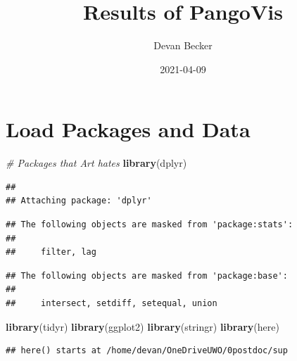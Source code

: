 \documentclass[
]{article}
\title{Results of PangoVis}
\author{Devan Becker}
\date{2021-04-09}
\newenvironment{Shaded}{\begin{snugshade}}{\end{snugshade}}
\newcommand{\CommentTok}[1]{\textcolor[rgb]{0.56,0.35,0.01}{\textit{#1}}}
\newcommand{\KeywordTok}[1]{\textcolor[rgb]{0.13,0.29,0.53}{\textbf{#1}}}
\newcommand{\NormalTok}[1]{#1}
\begin{document}
\maketitle

\hypertarget{load-packages-and-data}{%
\section{Load Packages and Data}\label{load-packages-and-data}}

\begin{Shaded}
\begin{Highlighting}[]
\CommentTok{\# Packages that Art hates}
\KeywordTok{library}\NormalTok{(dplyr)}
\end{Highlighting}
\end{Shaded}

\begin{verbatim}
## 
## Attaching package: 'dplyr'
\end{verbatim}

\begin{verbatim}
## The following objects are masked from 'package:stats':
## 
##     filter, lag
\end{verbatim}

\begin{verbatim}
## The following objects are masked from 'package:base':
## 
##     intersect, setdiff, setequal, union
\end{verbatim}

\begin{Shaded}
\begin{Highlighting}[]
\KeywordTok{library}\NormalTok{(tidyr)}
\KeywordTok{library}\NormalTok{(ggplot2)}
\KeywordTok{library}\NormalTok{(stringr)}
\KeywordTok{library}\NormalTok{(here)}
\end{Highlighting}
\end{Shaded}

\begin{verbatim}
## here() starts at /home/devan/OneDriveUWO/0postdoc/sup
\end{verbatim}
\end{document}
